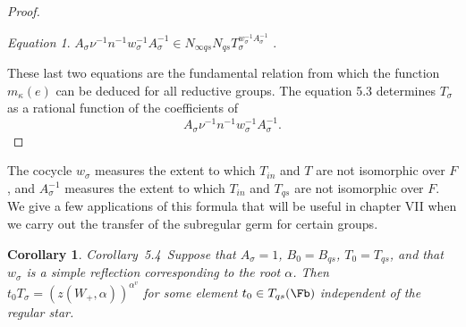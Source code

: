 \documentclass{memo-l}
\newtheorem{corollary}[theorem]{Corollary}
\theoremstyle{definition}
\theoremstyle{remark}
\newtheorem{eqn}[theorem]{Equation}
\numberwithin{section}{chapter}
\numberwithin{equation}{chapter}
\begin{document}
\begin{proof}
\begin{eqn}  %
$A_{{\sigma}}{\nu}^{-1}n^{-1}
w_{{\sigma}}^{-1}A_{{\sigma}}^{-1} \in
N_{{\infty}qs}N_{qs}T_{{\sigma}}^{w_\sigma^{-1}A_\sigma^{-1}}$ .
\end{eqn}

These last two equations are the fundamental relation from which the
function $m_{{\kappa}}(e)$ can be deduced for all reductive groups.
The equation 5.3 determines $T_{{\sigma}}$ as a rational function of
the coefficients
of $$A_{{\sigma}}{\nu}^{-1}n^{-1}w_{{\sigma}}^{-1}A_{{\sigma}}^{-1}.$$
\end{proof} 

The cocycle $w_{{\sigma}}$ measures the extent to which $T_{in}$ and
$T$ are not isomorphic over $F$, and $A_{{\sigma}}^{-1}$ measures the
extent to which $T_{in}$ and $T_{qs}$ are not isomorphic over $F$.  We
give a few applications of this formula that will be useful in chapter
VII when we carry out the transfer of the subregular germ for certain
groups.

\medskip

\begin{corollary}{Corollary\ 5.4}\   Suppose that $A_{{\sigma}} = 1$, $B_{0} = B_{qs}$,
$T_{0} = T_{qs}$, and that $w_{{\sigma}}$ is a simple reflection corresponding
to the root ${\alpha}$.
 Then $t_{0}T_{{\sigma}} = (z(W_{+},{\alpha}))^{\alpha^v}$  for some
element $t_{0} \in T_{qs}(\Fb)$ independent of the regular star.
\end{corollary}
\end{document}
